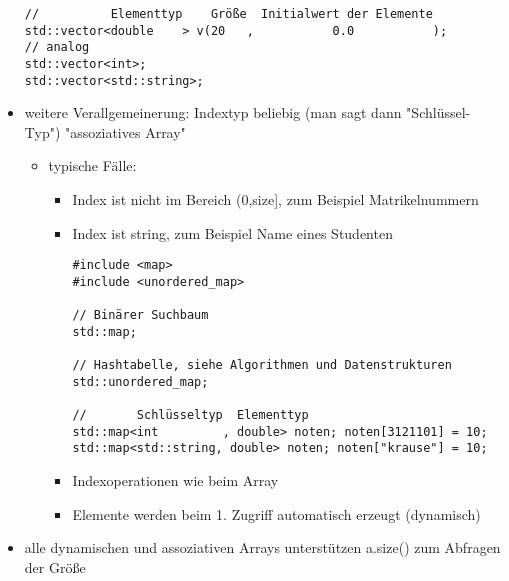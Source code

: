 \documentclass[a4paper]{scrartcl}
\theoremstyle{definition}
\theoremstyle{plain}
\theoremstyle{remark}
\theoremstyle{remark}
\begin{document}
\begin{itemize}
\begin{verbatim}
//          Elementtyp    Größe  Initialwert der Elemente
std::vector<double    > v(20   ,           0.0           );
// analog
std::vector<int>;
std::vector<std::string>;
\end{verbatim}
\item weitere Verallgemeinerung: Indextyp beliebig (man sagt dann "Schlüssel-Typ") "assoziatives Array"
\begin{itemize}
\item typische Fälle:
\begin{itemize}
\item Index ist nicht im Bereich (0,size], zum Beispiel Matrikelnummern
\item Index ist string, zum Beispiel Name eines Studenten
\begin{verbatim}
#include <map>
#include <unordered_map>

// Binärer Suchbaum
std::map;

// Hashtabelle, siehe Algorithmen und Datenstrukturen
std::unordered_map;

//       Schlüsseltyp  Elementtyp
std::map<int         , double> noten; noten[3121101] = 10;
std::map<std::string, double> noten; noten["krause"] = 10;
\end{verbatim}
\item Indexoperationen wie beim Array
\item Elemente werden beim 1. Zugriff automatisch erzeugt (dynamisch)
\end{itemize}
\end{itemize}
\item alle dynamischen und assoziativen Arrays unterstützen a.size() zum Abfragen der Größe
\end{itemize}
\end{document}
